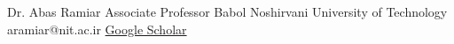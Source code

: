 %
%
%


\begin{referees}\label{supervisor}
		{Dr. Abas Ramiar}
		{Associate Professor}
		{Babol Noshirvani University of Technology}
		{aramiar@nit.ac.ir}
		{\href{https://scholar.google.com/citations?hl=en\&user=ew-WXvQAAAAJ}{Google Scholar}}
\end{referees}
